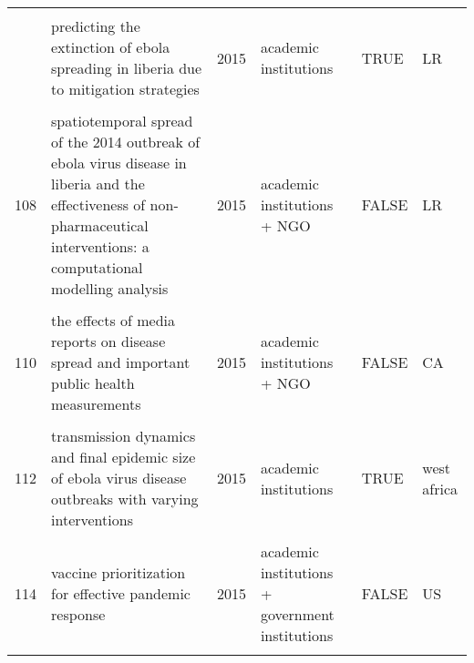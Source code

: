 \documentclass[
]{article}
\begin{document}
\begin{landscape}
\begin{longtable}{l>{\raggedright\arraybackslash}p{4cm}l>{\raggedright\arraybackslash}p{3.5cm}l>{\raggedright\arraybackslash}p{1.5cm}}
\cellcolor{gray!6}{105} & \cellcolor{gray!6}{optimal intervention strategies for a seir control model of ebola epidemics} & \cellcolor{gray!6}{2015} & \cellcolor{gray!6}{academic institutions} & \cellcolor{gray!6}{TRUE} & \cellcolor{gray!6}{none}\\
\addlinespace
106 & predicting the extinction of ebola spreading in liberia due to mitigation strategies & 2015 & academic institutions & TRUE & LR\\
\cellcolor{gray!6}{107} & \cellcolor{gray!6}{school closure strategies for the 2009 hong kong hini influenza pandemic} & \cellcolor{gray!6}{2015} & \cellcolor{gray!6}{academic institutions} & \cellcolor{gray!6}{TRUE} & \cellcolor{gray!6}{HK}\\
108 & spatiotemporal spread of the 2014 outbreak of ebola virus disease in liberia and the effectiveness of non-pharmaceutical interventions: a computational modelling analysis & 2015 & academic institutions + NGO & FALSE & LR\\
\cellcolor{gray!6}{109} & \cellcolor{gray!6}{strategies for early vaccination during novel influenza outbreaks} & \cellcolor{gray!6}{2015} & \cellcolor{gray!6}{academic institutions + NGO} & \cellcolor{gray!6}{FALSE} & \cellcolor{gray!6}{CA}\\
110 & the effects of media reports on disease spread and important public health measurements & 2015 & academic institutions + NGO & FALSE & CA\\
\addlinespace
\cellcolor{gray!6}{111} & \cellcolor{gray!6}{the impact of human behavioral changes in 2014 west africa ebola outbreak} & \cellcolor{gray!6}{2015} & \cellcolor{gray!6}{NGO} & \cellcolor{gray!6}{FALSE} & \cellcolor{gray!6}{GN LR SL}\\
112 & transmission dynamics and final epidemic size of ebola virus disease outbreaks with varying interventions & 2015 & academic institutions & TRUE & west africa\\
\cellcolor{gray!6}{113} & \cellcolor{gray!6}{treatment–donation-stockpile dynamics in ebola convalescent blood transfusion therapy} & \cellcolor{gray!6}{2015} & \cellcolor{gray!6}{academic institutions} & \cellcolor{gray!6}{TRUE} & \cellcolor{gray!6}{west africa}\\
114 & vaccine prioritization for effective pandemic response & 2015 & academic institutions + government institutions & FALSE & US\\
\cellcolor{gray!6}{115} & \cellcolor{gray!6}{a mathematical study of a tb model with treatment interruptions and two latent periods} & \cellcolor{gray!6}{2014} & \cellcolor{gray!6}{academic institutions} & \cellcolor{gray!6}{TRUE} & \cellcolor{gray!6}{none}\\

\end{longtable}
\end{landscape}
\end{document}
